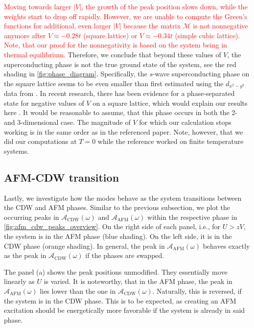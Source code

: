 \documentclass[
    reprint, 
    aps,
    preprintnumbers,
    twocolumn,
    prb,
    superscriptaddress
]{revtex4-2}
\newcommand{\mM}{\mathcal{M}}
\newcommand{\spectral}[1]{\mathcal{A}_\text{#1}  (\omega)}
\begin{document}
\textcolor{red}{Moving towards larger $|V|$, the growth of the peak position slows down, while the weights start to drop off rapidly.
However, we are unable to compute the Green's functions for additional, even larger $|V|$ because the matrix $\mM$ is not nonnegative anymore after $V\approx -0.28t$ (square lattice) or $V\approx -0.34t$ (simple cubic lattice).
Note, that our proof for the nonnegativity is based on the system being in thermal equilibrium.}
Therefore, we conclude that beyond these values of $V$, the superconducting phase is not the true ground state of the system, see the red shading in \autoref{fig:phase_diagram}.
Specifically, the $s$-wave superconducting phase on the square lattice seems to be even smaller than first estimated using the $d_{x^2 -y^2}$ data from \cite{Micnas88b}.
In recent research, there has been evidence for a phase-separated state for negative values of $V$ on a square lattice, which would explain our results here \cite{Linner23}.
It would be reasonable to assume, that this phase occurs in both the 2- and 3-dimensional case.
The magnitude of $V$ for which our calculation stops working is in the same order as in the referenced paper.
Note, however, that we did our computations at $T=0$ while the reference worked on finite temperature systems.



\subsection{AFM-CDW transition}

Lastly, we investigate how the modes behave as the system transitions between the CDW and AFM phases.
Similar to the previous subsection, we plot the occurring peaks in $\spectral{CDW}$ and $\spectral{AFM}$ within the respective phase in \autoref{fig:afm_cdw_peaks_overview}.
On the right side of each panel, i.e., for $U > zV$, the system is in the AFM phase (blue shading).
On the left side, it is in the CDW phase (orange shading).
In general, the peak in $\spectral{AFM}$ behaves exactly as the peak in $\spectral{CDW}$ if the phases are swapped.

The panel (a) shows the peak positions unmodified. They essentially move linearly as $U$ is varied.
It is noteworthy, that in the AFM phase, the peak in $\spectral{AFM}$ lies lower than the one in $\spectral{CDW}$.
Naturally, this is reversed, if the system is in the CDW phase.
This is to be expected, as creating an AFM excitation should be energetically more favorable if the system is already in said phase.
\end{document}
